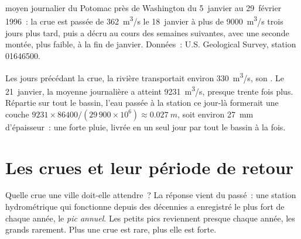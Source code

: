 \begin{omfigure}

{\small {} moyen journalier du Potomac près de Washington du 5~janvier au
29~février 1996~: la crue est passée de \qty{362}{m^3/s} le 18~janvier à
plus de \qty{9000}{m^3/s} trois jours plus tard, puis a décru au cours des
semaines suivantes, avec une seconde montée, plus faible, à la fin de
janvier. Données~: U.S. Geological Survey, station 01646500.}
\end{omfigure}

Les jours précédant la crue, la rivière transportait environ
\qty{330}{m^3/s}, son . Le 21~janvier, la moyenne journalière
a atteint \qty{9231}{m^3/s}, presque trente fois plus. Répartie sur tout le
bassin, l'eau passée à la station ce jour-là formerait une couche
$9231 \times 86400 / (29\,900 \times 10^6) \approx \qty{0.027}{m}$, soit
environ \qty{27}{mm} d'épaisseur~: une forte pluie, livrée en un seul jour
par tout le bassin à la fois.

\section{Les crues et leur période de retour}

Quelle crue une ville doit-elle attendre~? La réponse vient du passé~: une
station hydrométrique qui fonctionne depuis des décennies a enregistré le
plus fort  de chaque année, le \emph{pic annuel}. Les petits pics
reviennent presque chaque année, les grands rarement. Plus une crue est
rare, plus elle est forte.

